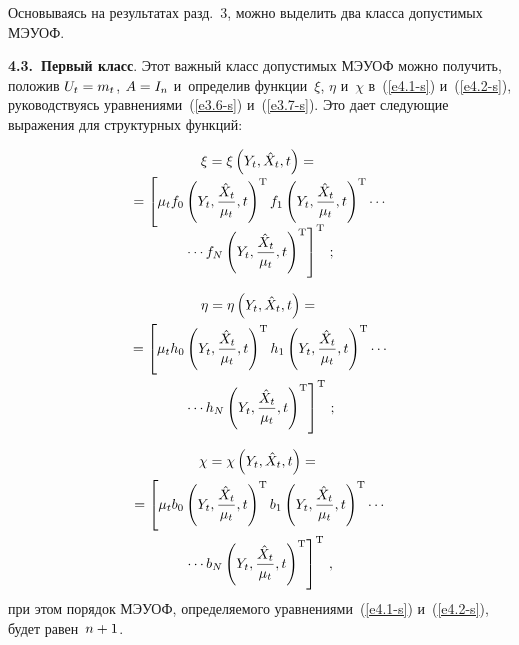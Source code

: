 \begin{multicols}{2}
Основываясь на результатах разд.~3, можно выделить два класса
допустимых МЭУОФ.

\textbf{4.3.\ Первый класс}. Этот важный класс допустимых МЭУОФ можно
получить, положив $U_t \hm=m_t$, $ A\hm=I_n$ и~определив функции~$\xi$,
$\eta$ и~$\chi$ в~(\ref{e4.1-s}) и~(\ref{e4.2-s}), руководствуясь уравнениями~(\ref{e3.6-s}) 
и~(\ref{e3.7-s}). Это дает следующие выражения для структурных
функций:


\noindent
 \begin{multline*}
 \xi=\xi \left(Y_t,\hXt,t\right) ={}\\[-2pt]
 {}=
  \left[ 
 \mu_t f_0 \left(Y_t,\fr{\hXt}{\mu_t},t\right)^{\mathrm{T}} f_1 
 \left(Y_t,\fr{\hXt}{\mu_t},t\right)^{\mathrm{T}}\cdots\right.\\[-6pt]
\left. \cdots   f_N \left(Y_t,\fr{\hXt}{\mu_t},t\right)^{\mathrm{T}}
\right]^{\mathrm{T}}\,; %
\end{multline*}


\noindent
\begin{multline*}
    \eta=\eta \left(Y_t,{\hat X_t},t\right) ={}\\
    {}= \left[ 
    \mu_t h_0 \left(Y_t,\displaystyle\frac{\displaystyle {\hat X_t}\mathstrut}{\displaystyle \mu_t\mathstrut},t\right)^{\mathrm{T}} h_1 
    \left(Y_t,\displaystyle\frac{\displaystyle {\hat X_t}\mathstrut}{\displaystyle \mu_t\mathstrut},t\right)^{\mathrm{T}}\cdots\right.\\
\left.\cdots    h_N\left(Y_t,\displaystyle\frac{\displaystyle {\hat X_t}\mathstrut}{\displaystyle \mu_t\mathstrut},t\right)^{\mathrm{T}}\right]^{\mathrm{T}}
\,;
\end{multline*}

\vspace*{-12pt}

\noindent
\begin{multline*}
\chi=\chi \left(Y_t,{\hat X_t},t\right) = {}\\
{}=\left[ \mu_t b_0 
\left(Y_t,\displaystyle\frac{\displaystyle {\hat X_t}\mathstrut}{\displaystyle \mu_t\mathstrut},t\right)^{\mathrm{T}} b_1 
\left(Y_t,\displaystyle\frac{\displaystyle {\hat X_t}\mathstrut}{\displaystyle \mu_t\mathstrut},t\right)^{\mathrm{T}}\cdots\right.
\\
\left.\cdots    b_N \left(Y_t,\displaystyle\frac{\displaystyle {\hat X_t}\mathstrut}{\displaystyle \mu_t\mathstrut},t\right)^{\mathrm{T}}
\right]^{\mathrm{T}}\,,
\end{multline*}
при этом порядок МЭУОФ, определяемого уравнениями~(\ref{e4.1-s}) и~(\ref{e4.2-s}),
 будет равен~$n\hm+1$.


\end{multicols}
